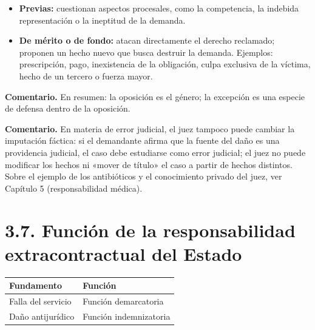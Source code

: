 \begin{itemize}
\item \textbf{Previas:} cuestionan aspectos procesales, como la competencia, la indebida representación o la ineptitud de la demanda.
\item \textbf{De mérito o de fondo:} atacan directamente el derecho reclamado; proponen un hecho nuevo que busca destruir la demanda. Ejemplos: prescripción, pago, inexistencia de la obligación, culpa exclusiva de la víctima, hecho de un tercero o fuerza mayor.
\end{itemize}
\begin{comentario}
\textcolor[HTML]{8A6D3B}{\textbf{Comentario. }}En resumen: la oposición es el género; la excepción es una especie de defensa dentro de la oposición.
\par
\textcolor[HTML]{8A6D3B}{\textbf{Comentario. }}En materia de error judicial, el juez tampoco puede cambiar la imputación fáctica: si el demandante afirma que la fuente del daño es una providencia judicial, el caso debe estudiarse como error judicial; el juez no puede modificar los hechos ni «mover de título» el caso a partir de hechos distintos. Sobre el ejemplo de los antibióticos y el conocimiento privado del juez, ver Capítulo 5 (responsabilidad médica).
\end{comentario}
\section{3.7. Función de la responsabilidad extracontractual del Estado}
\begin{tabla}
\begin{longtable}{|>{\raggedright\arraybackslash}m{}|>{\raggedright\arraybackslash}m{}|}
\hline
\cellcolor[HTML]{1F3864}\textcolor[HTML]{FFFFFF}{\textbf{Fundamento}} & \cellcolor[HTML]{1F3864}\textcolor[HTML]{FFFFFF}{\textbf{Función}} \\ \hline
Falla del servicio & Función demarcatoria \\ \hline
\cellcolor[HTML]{F2F5FA}Daño antijurídico & \cellcolor[HTML]{F2F5FA}Función indemnizatoria \\ \hline
\end{longtable}
\end{tabla}
